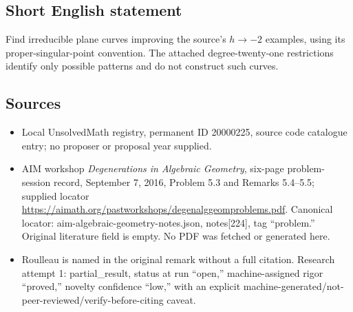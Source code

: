 \documentclass[11pt]{article}
\begin{document}
\subsection{Short English statement}
Find irreducible plane curves improving the source's $h\to-2$ examples, using its proper-singular-point convention. The attached degree-twenty-one restrictions identify only possible patterns and do not construct such curves.
\subsection{Sources}
\begin{itemize}
\item Local UnsolvedMath registry, permanent ID 20000225, source code catalogue entry; no proposer or proposal year supplied.
\item AIM workshop \emph{Degenerations in Algebraic Geometry}, six-page problem-session record, September 7, 2016, Problem 5.3 and Remarks 5.4--5.5; supplied locator \url{https://aimath.org/pastworkshops/degenalggeomproblems.pdf}. Canonical locator: aim-algebraic-geometry-notes.json, notes[224], tag ``problem.'' Original literature field is empty. No PDF was fetched or generated here.
\item Roulleau is named in the original remark without a full citation. Research attempt 1: partial\_result, status at run ``open,'' machine-assigned rigor ``proved,'' novelty confidence ``low,'' with an explicit machine-generated/not-peer-reviewed/verify-before-citing caveat.
\end{itemize}
\end{document}
